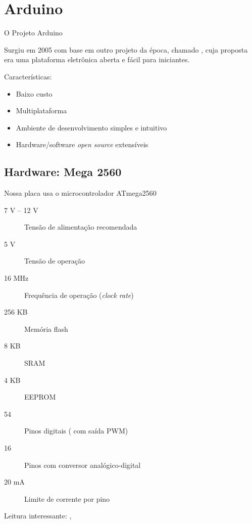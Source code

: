 
\section{Arduino}


\begin{frame}{O Projeto Arduino}

	Surgiu em 2005 com base em outro projeto da época, chamado , cuja proposta era uma plataforma eletrônica aberta e fácil para iniciantes.

	\medskip
	Características:
	\begin{itemize}
		\item Baixo custo
		\item Multiplataforma
		\item Ambiente de desenvolvimento simples e intuitivo
		\item Hardware/software \textit{open source} extensíveis
	\end{itemize}

\end{frame}


\subsection{Hardware: Mega 2560}


\begin{frame}[b]{\insertsubsection}

	Nossa placa usa o microcontrolador ATmega2560
	\begin{description}
		\item[7 V -- 12 V] Tensão de alimentação recomendada
		\item[5 V] Tensão de operação
		\item[16 MHz] Frequência de operação (\textit{clock rate})
		\item[256 KB] Memória flash
		\item[8 KB] SRAM
		\item[4 KB] EEPROM
		\item[54] Pinos digitais ( com saída PWM)
		\item[16] Pinos com conversor analógico-digital
		\item[20 mA] Limite de corrente por pino
	\end{description}

	\vfill
	Leitura interessante: , 

\end{frame}


